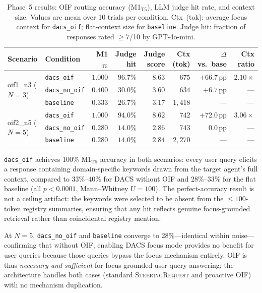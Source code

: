 \documentclass{article}
\begin{document}
\begin{table}[t]
\caption{Phase~5 results: OIF routing accuracy (M1$_{\mathrm{T5}}$),
LLM judge hit rate, and context size.
Values are mean over 10 trials per condition.
Ctx~(tok): average focus context for \texttt{dacs\_oif};
flat-context size for \texttt{baseline}.
Judge hit: fraction of responses rated $\ge 7$/10 by GPT-4o-mini.}
\label{tab:phase5}
\centering
\footnotesize
\setlength{\tabcolsep}{4pt}
\begin{tabular}{llrrrrrr}
\toprule
Scenario & Condition & M1$_{\mathrm{T5}}$ & Judge hit & Judge score & Ctx (tok) & $\Delta$ vs.~base & Ctx ratio \\
\midrule
\multirow{3}{*}{oif1\_n3 ($N=3$)}
  & \texttt{dacs\_oif}     & $\mathbf{1.000}$ & $96.7\%$ & $8.63$ & $675$   & $+66.7$\,pp & $2.10\times$ \\
  & \texttt{dacs\_no\_oif} & $0.400$           & $30.0\%$ & $3.60$ & $634$   & $+6.7$\,pp  & ---          \\
  & \texttt{baseline}      & $0.333$           & $26.7\%$ & $3.17$ & $1{,}418$ & ---         & ---          \\[4pt]
\multirow{3}{*}{oif2\_n5 ($N=5$)}
  & \texttt{dacs\_oif}     & $\mathbf{1.000}$ & $94.0\%$ & $8.62$ & $742$   & $+72.0$\,pp & $3.06\times$ \\
  & \texttt{dacs\_no\_oif} & $0.280$           & $14.0\%$ & $2.86$ & $743$   & $0.0$\,pp   & ---          \\
  & \texttt{baseline}      & $0.280$           & $14.0\%$ & $2.84$ & $2{,}270$ & ---         & ---          \\
\bottomrule
\end{tabular}
\end{table}

\texttt{dacs\_oif} achieves 100\% M1$_{\mathrm{T5}}$ accuracy in
both scenarios: every user query elicits a response containing
domain-specific keywords drawn from the target agent's full
context, compared to 33\%--40\% for DACS without OIF and
28\%--33\% for the flat baseline (all $p < 0.0001$, Mann--Whitney
$U = 100$).
The perfect-accuracy result is not a ceiling artifact: the
keywords were selected to be absent from the ${\le}100$-token
registry summaries, ensuring that any hit reflects genuine
focus-grounded retrieval rather than coincidental registry mention.

At $N=5$, \texttt{dacs\_no\_oif} and \texttt{baseline} converge
to 28\%---identical within noise---confirming that without OIF,
enabling DACS focus mode provides no benefit for user queries
because those queries bypass the focus mechanism entirely.
OIF is thus \emph{necessary and sufficient} for focus-grounded
user-query answering: the architecture handles both cases
(standard \textsc{SteeringRequest} and proactive OIF) with no
mechanism duplication.
\end{document}
